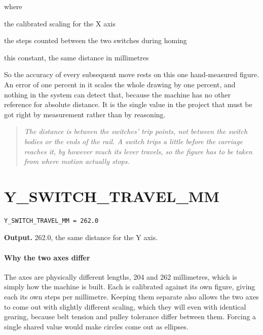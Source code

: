 \noindent where
\begin{description}[leftmargin=2.4em,style=nextline,font=\normalfont\ttfamily]\setlength\itemsep{1pt}
  \item[{$\mathrm{stepsPerMm}_X$}] \normalfont the calibrated scaling for the X axis
  \item[{$\mathrm{travelSteps}_X$}] \normalfont the steps counted between the two switches during homing
  \item[{$\mathrm{X\_SWITCH\_TRAVEL\_MM}$}] \normalfont this constant, the same distance in millimetres
\end{description}
So the accuracy of every subsequent move rests on this one hand-measured figure. An error of one percent in it scales the whole drawing by one percent, and nothing in the system can detect that, because the machine has no other reference for absolute distance. It is the single value in the project that must be got right by measurement rather than by reasoning.


\begin{quote}\small\itshape The distance is between the switches' \emph{trip points}, not between the switch bodies or the ends of the rail. A switch trips a little before the carriage reaches it, by however much its lever travels, so the figure has to be taken from where motion actually stops.\end{quote}

\section{Y\_SWITCH\_TRAVEL\_MM}
\begin{lstlisting}[style=sig]
Y_SWITCH_TRAVEL_MM = 262.0
\end{lstlisting}

\noindent\textbf{Output.} 262.0, the same distance for the Y axis.


\paragraph{Why the two axes differ}
The axes are physically different lengths, 204 and 262 millimetres, which is simply how the machine is built. Each is calibrated against its own figure, giving each its own steps per millimetre. Keeping them separate also allows the two axes to come out with slightly different scaling, which they will even with identical gearing, because belt tension and pulley tolerance differ between them. Forcing a single shared value would make circles come out as ellipses.


